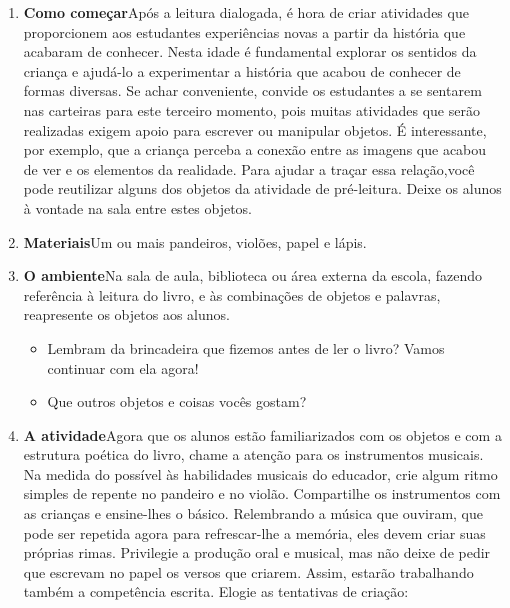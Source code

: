 \documentclass[11pt]{extarticle}
\begin{document}
\begin{enumerate}
 

\begin{enumerate}
\item \textbf{Como começar}\quad Após a leitura dialogada, é hora de criar 
atividades que proporcionem aos estudantes experiências novas a partir da história 
que acabaram de conhecer. Nesta idade é fundamental explorar os sentidos da criança e 
ajudá-lo a experimentar a história que acabou de conhecer de formas diversas. Se achar 
conveniente, convide os estudantes a se sentarem nas carteiras para este terceiro 
momento, pois muitas atividades que serão realizadas exigem apoio para escrever 
ou manipular objetos. É interessante, por exemplo, que a criança perceba a conexão 
entre as imagens que acabou de ver e os elementos da realidade. Para ajudar a traçar 
essa relação,você pode reutilizar alguns dos objetos da atividade de pré-leitura.
Deixe os alunos à vontade na sala entre estes objetos.

\item \textbf{Materiais}\quad Um ou mais pandeiros, violões, papel e lápis.
\item \textbf{O ambiente}\quad Na sala de aula, biblioteca ou área 
externa da escola, fazendo referência à leitura do livro, e 
às combinações de objetos e palavras, reapresente os objetos aos alunos. 

\begin{itemize}
\item Lembram da brincadeira que fizemos antes de ler o livro? Vamos continuar com ela agora!
\item Que outros objetos e coisas vocês gostam?
\end{itemize}

\item \textbf{A atividade}\quad Agora que os alunos estão 
familiarizados com os objetos e com a estrutura poética do livro,
chame a atenção para os instrumentos musicais. Na medida do possível
às habilidades musicais do educador, crie algum ritmo simples 
de repente no pandeiro e no violão. Compartilhe os instrumentos com as 
crianças e ensine-lhes o básico. 
Relembrando a música que ouviram, que pode ser repetida agora
para refrescar-lhe a memória, eles devem criar suas próprias rimas.
Privilegie a produção oral e musical, mas não deixe de pedir
que escrevam no papel os versos que criarem. Assim, estarão
trabalhando também a competência escrita. 
Elogie as tentativas de criação:


\end{enumerate}
\end{enumerate}
\end{document}
